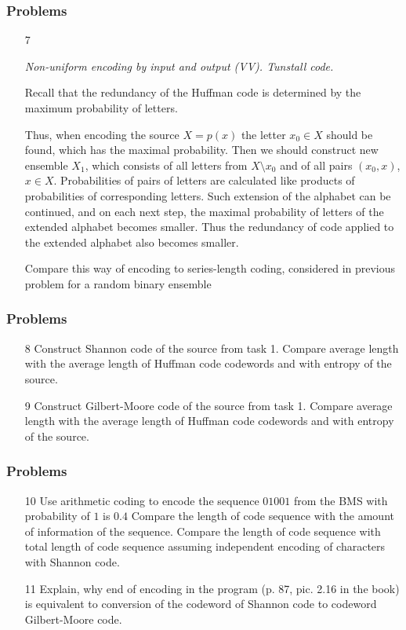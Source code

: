 \documentclass[14pt]{beamer}
\begin{document}
\begin{frame}
\frametitle{Problems}
\begin{enumerate}
  \item[7] 
  \footnotesize { \emph{Non-uniform encoding by input and output (VV). Tunstall code.}
  
  Recall that the redundancy of the Huffman code is determined by the maximum probability of letters. 
  
  Thus, when encoding the source $X={p(x)}$ the letter $x_0\in X$ should be found, which has the maximal probability. Then we should construct new ensemble $X_1$, which consists of all letters from $X\setminus{x_0}$ and of all pairs $(x_0,x)$, $x\in X$. Probabilities of pairs of letters are calculated like products of probabilities of corresponding letters. 
  Such extension of the alphabet can be continued, and on each next step, the maximal probability of letters of the extended alphabet becomes smaller. Thus the redundancy of code applied to the extended alphabet also becomes smaller.

  Compare this way of encoding to series-length coding, considered in previous problem for a random binary ensemble 
 
}
\end{enumerate}
\end{frame}


\begin{frame}
\frametitle{Problems}
\begin{enumerate}
\item[8] Construct Shannon code of the source from task 1. Compare average length with the average length of Huffman code codewords and with entropy of the source.

\pause \item[9] Construct Gilbert-Moore code of the source from task 1. Compare average length with the average length of Huffman code codewords and with entropy of the source.

\end{enumerate}
\end{frame}


\begin{frame}
\frametitle{Problems}
\begin{enumerate}

 \item[10] Use arithmetic coding to encode the sequence $01001$ from the BMS with probability of $1$ is $0.4$
 Compare the length of code sequence with the amount of information of the sequence. 
 Compare the length of code sequence with total length of code sequence assuming independent encoding of characters with Shannon code.
 
\pause \item[11] Explain, why end of encoding in the program (p. 87, pic. 2.16 in the book) is equivalent to conversion of the codeword of Shannon code to codeword Gilbert-Moore code.

\end{enumerate}
\end{frame}
\end{document}
